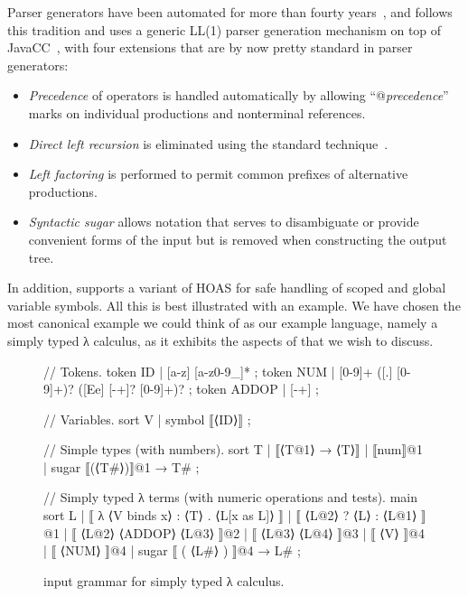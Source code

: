 \documentclass[letterpaper]{article}
\begin{document}
Parser generators have been automated for more than fourty years~\cite{GruneJacobs:2008}, and \HAX
follows this tradition and uses a generic LL(1) parser generation mechanism on top of
JavaCC~\cite{JavaCC}, with four extensions that are by now pretty standard in parser generators:
\begin{itemize}

\item \emph{Precedence} of operators is handled automatically by allowing ``@\textit{precedence}''
  marks on individual productions and nonterminal references.

\item \emph{Direct left recursion} is eliminated using the standard technique~\cite{Aho+:2006}.

\item \emph{Left factoring} is performed to permit common prefixes of alternative productions.

\item \emph{Syntactic sugar} allows notation that serves to disambiguate or provide convenient forms
  of the input but is removed when constructing the output tree.

\end{itemize}
In addition, \HAX supports a variant of HOAS for safe handling of scoped and global variable
symbols.
All this is best illustrated with an example. We have chosen the most canonical example we could
think of as our example language, namely a simply typed λ calculus, as it exhibits the aspects of
\HAX that we wish to discuss.

\begin{figure}[t]\small
  \begin{hacs}[texcl,xleftmargin=2em,numbers=left,firstnumber=3]
// Tokens.
token ID | [a-z] [a-z0-9_]*  ;
token NUM | [0-9]+ ([.] [0-9]+)? ([Ee] [-+]? [0-9]+)? ;
token ADDOP | [-+] ;

// Variables.
sort V  | symbol ⟦⟨ID⟩⟧ ;

// Simple types (with numbers).
sort T  | ⟦⟨T@1⟩ → ⟨T⟩⟧  | ⟦num⟧@1   | sugar ⟦(⟨T#⟩)⟧@1 →   T# ;

// Simply typed λ terms (with numeric operations and tests).
main sort L
| ⟦ λ ⟨V binds x⟩ : ⟨T⟩ . ⟨L[x as L]⟩ ⟧
| ⟦ ⟨L@2⟩ ? ⟨L⟩ : ⟨L@1⟩ ⟧@1
| ⟦ ⟨L@2⟩ ⟨ADDOP⟩ ⟨L@3⟩ ⟧@2
| ⟦ ⟨L@3⟩ ⟨L@4⟩ ⟧@3
| ⟦ ⟨V⟩ ⟧@4
| ⟦ ⟨NUM⟩ ⟧@4
| sugar ⟦ ( ⟨L#⟩ ) ⟧@4  →  L#
;
  \end{hacs}
  \caption{\HAX input grammar for simply typed λ calculus.}
  \label{fig:parser}
\end{figure}
\end{document}

